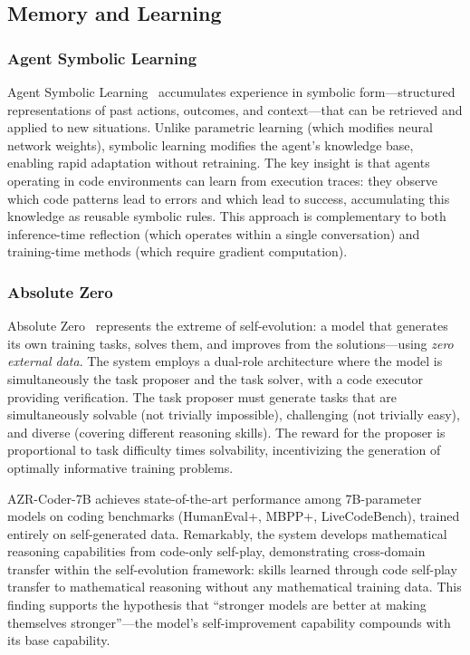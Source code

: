 \documentclass[11pt,a4paper]{article}
\begin{document}
\subsection{Memory and Learning}

\subsubsection{Agent Symbolic Learning}

Agent Symbolic Learning~\citep{wang2024agent_symbolic} accumulates experience in symbolic form---structured representations of past actions, outcomes, and context---that can be retrieved and applied to new situations. Unlike parametric learning (which modifies neural network weights), symbolic learning modifies the agent's knowledge base, enabling rapid adaptation without retraining. The key insight is that agents operating in code environments can learn from execution traces: they observe which code patterns lead to errors and which lead to success, accumulating this knowledge as reusable symbolic rules. This approach is complementary to both inference-time reflection (which operates within a single conversation) and training-time methods (which require gradient computation).

\subsubsection{Absolute Zero}

Absolute Zero~\citep{zhao2025absolute_zero} represents the extreme of self-evolution: a model that generates its own training tasks, solves them, and improves from the solutions---using \emph{zero external data}. The system employs a dual-role architecture where the model is simultaneously the task proposer and the task solver, with a code executor providing verification. The task proposer must generate tasks that are simultaneously solvable (not trivially impossible), challenging (not trivially easy), and diverse (covering different reasoning skills). The reward for the proposer is proportional to task difficulty times solvability, incentivizing the generation of optimally informative training problems.

AZR-Coder-7B achieves state-of-the-art performance among 7B-parameter models on coding benchmarks (HumanEval+, MBPP+, LiveCodeBench), trained entirely on self-generated data. Remarkably, the system develops mathematical reasoning capabilities from code-only self-play, demonstrating cross-domain transfer within the self-evolution framework: skills learned through code self-play transfer to mathematical reasoning without any mathematical training data. This finding supports the hypothesis that ``stronger models are better at making themselves stronger''---the model's self-improvement capability compounds with its base capability.
\end{document}
